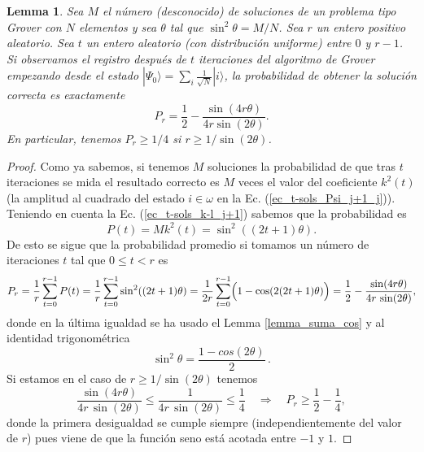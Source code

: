 \documentclass[a4paper,11pt]{book} %
\newtheorem{lemma_contador}{Lemma}
\newcommand{\Lemma}[1]{
		\begin{mybox_gray2}{}
			\begin{lemma_contador}
				 #1 
			\end{lemma_contador} 
		\end{mybox_gray2}
	}
\numberwithin{equation}{chapter}
\def\Lp{\Bigl(}
\def\Rp{\Bigr)}
\def\rqa{\quad \Rightarrow \quad}
\begin{document}
\Lemma{ \label{lemma_Pm}
Sea $M$ el número (desconocido) de soluciones de un problema tipo Grover con $N$ elementos y sea $\theta$ tal que $\sin^2 \theta = M/N$. Sea $r$ un entero positivo aleatorio. Sea $t$ un entero aleatorio (con distribución uniforme) entre $0$ y $r-1$. Si observamos el registro después de $t$ iteraciones del algoritmo de Grover empezando desde el estado $|\Psi_0 \rangle = \sum_i \frac{1}{\sqrt{N}} | i \rangle$, la probabilidad de obtener la solución correcta es exactamente 
\begin{equation} \label{lemma_Pm_ec}
P_r = \frac{1}{2} - \frac{\sin (4 r \theta)}{4 r \sin(2 \theta)}.
\end{equation}
En particular, tenemos $P_r \geq 1/4$ si $r \geq 1/\sin ( 2 \theta)$.
}


\begin{proof}
 Como ya sabemos, si tenemos $M$ soluciones la probabilidad de que tras $t$ iteraciones se mida el resultado correcto es $M$ veces el valor del coeficiente $k^2(t)$ (la amplitud al cuadrado del estado $i \in \omega$ en la Ec. (\ref{ec_t-sols_Psi_j+1_j})). Teniendo en cuenta la Ec. (\ref{ec_t-sols_k-l_j+1}) sabemos que la probabilidad es
\begin{equation*}
P(t) = M k^2(t) = \sin^2 ((2t+1)\theta).
\end{equation*}
De esto se sigue que la probabilidad promedio si tomamos un número de iteraciones $t$ tal que $0 \leq t < r$ es
\begin{equation*}
P_r = \frac{1}{r} \sum^{r-1}_{t=0}  P(t) = \frac{1}{r} \sum^{r-1}_{t=0} \sin^2 ((2t+1) \theta) = 
\frac{1}{2r} \sum^{r-1}_{t=0} \Lp 1-\cos (2(2t+1) \theta) \Rp = \frac{1}{2} - \frac{\sin (4 r \theta)}{4 r \, \sin (2 \theta)},
\end{equation*}
donde en la última igualdad se ha usado el Lemma \ref{lemma_suma_cos}  y al identidad trigonométrica
	\begin{equation}
	\sin^2 \theta = \frac{1 - cos (2\theta)}{2}\,.
	\end{equation}
Si estamos en el caso de $r \geq 1/\sin (2\theta)$ tenemos
\begin{equation*}
\frac{\sin (4 r \theta)}{4 r \, \sin (2 \theta)} \leq \frac{1}{4 r \, \sin (2 \theta)} \leq \frac{1}{4} \rqa P_r \geq \frac{1}{2} - \frac{1}{4},
\end{equation*}
donde la primera desigualdad se cumple siempre (independientemente del valor de $r$) pues viene de que la función seno está acotada entre $-1$ y $1$.
\end{proof}
\end{document}
